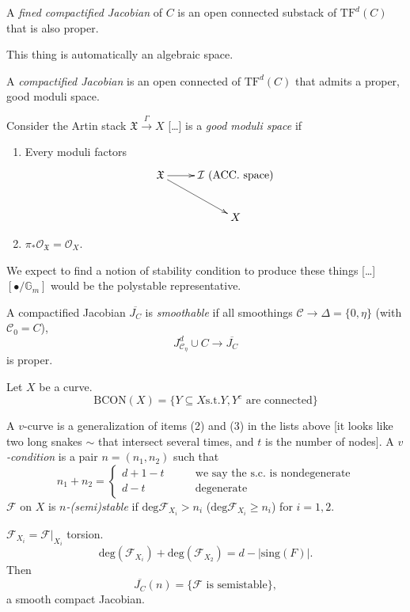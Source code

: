 \begin{definition}
\label{definition-fine-compactified-Jacobian}
A {\it fined compactified Jacobian} of $C$ is
an open connected substack of
$\text{TF}^d(C)$ that is also proper.
\end{definition}

\begin{remark}
\label{remark-algebraic-space}
This thing is automatically an algebraic
space.
\end{remark}

\begin{definition}
\label{definition-compactified-Jacobian}
A {\it compactified Jacobian} is an open
connected of $\text{TF}^d(C)$ that
admits a proper, good moduli space.
\end{definition}

Consider the Artin stack $\mathfrak{X}
\xrightarrow{\Gamma}X$ […]
 is a {\it good
moduli space} if
\begin{enumerate}
\item Every moduli factors
$$
\xymatrix{
\mathfrak{X} \ar[r]\ar[rd]&\mathcal{I}\text{
(ACC. space)}\\
& X
}
$$
\item
$\pi_*\mathcal{O}_{\mathfrak{X}}=\mathcal{O}
_X$.
\end{enumerate}

\medskip\noindent
We expect to find a notion of stability
condition to produce these things
[…] $[\bullet/ \mathbb{G}_m]$ would be the
polystable representative.

\begin{definition}
\label{definition-smoot-compa-jacob}
A compactified Jacobian $\overline{J_C}$ is
{\it smoothable} if all smoothings
$\mathcal{C}\to \Delta=\{0,\eta\}$ (with
$\mathcal{C}_0=C$),
$$
J^d_{\mathcal{C}_\eta}\cup C \to
\overline{J_C}
$$
is proper.
\end{definition}

\medskip\noindent

\begin{definition}
\label{definition-connected}
Let $X$ be a curve.
$$
\text{BCON}(X)=\{Y \subseteq X\text{s.t.
}Y,Y^c \text{ are connected}\}
$$
\end{definition}

\begin{definition}
\label{definition-v-satbility}
A $v$-curve is a generalization of items (2)
and (3) in the lists above
[it looks like two long snakes $\sim$ that
intersect several times, and $t$ is
the number of nodes].
A {\it $v$-condition} is a pair $n=(n_1,n_2)$
such that
$$
n_1+n_2=\begin{cases}
d+1-t\qquad &\text{we say the s.c. is
nondegenerate} \\
d-t\qquad &\text{degenerate}
\end{cases}
$$
$\mathcal{F}$ on $X$ is  {\it
$n$-(semi)stable} if
$\text{deg}\mathcal{F}_{X_i}>n_i$
($\text{deg}\mathcal{F}_{X_i}\geq n_i$)
for $i=1,2$.
\end{definition}
$\mathcal{F}_{X_i}=\mathcal{F}|_{X_i}$
torsion.
$$
\text{deg}(\mathcal{F}_{X_i})+\text{deg}
(\mathcal{F}_{X_2})
=d-|\text{sing}(F)|.
$$
Then
$$
\overline{J_C}(n)=\{\mathcal{F}\text{ is
semistable}\},
$$
a smooth compact Jacobian.

